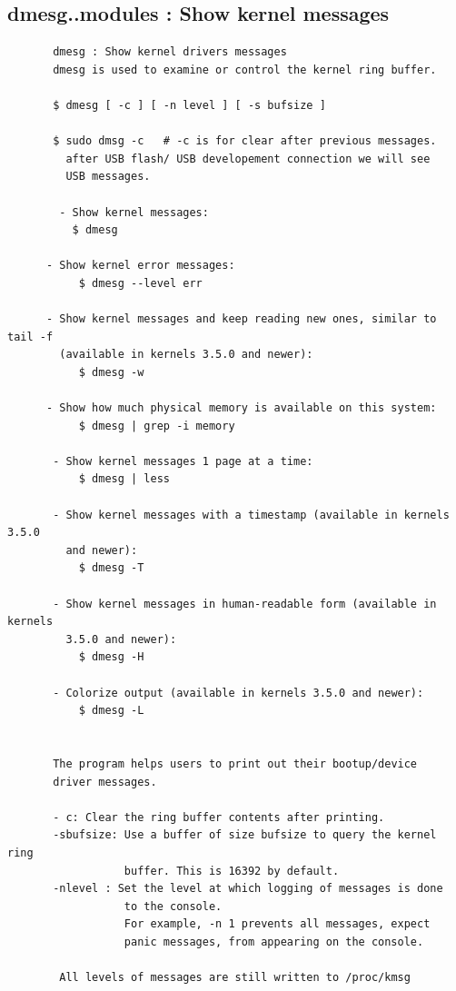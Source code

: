 \documentclass[a4paper,12pt]{article}
\begin{document}
\subsection{dmesg..modules : Show kernel messages }
\begin{verbatim}
       dmesg : Show kernel drivers messages
       dmesg is used to examine or control the kernel ring buffer.

       $ dmesg [ -c ] [ -n level ] [ -s bufsize ]

       $ sudo dmsg -c   # -c is for clear after previous messages.
         after USB flash/ USB developement connection we will see 
         USB messages. 

        - Show kernel messages:
          $ dmesg

      - Show kernel error messages:
           $ dmesg --level err

      - Show kernel messages and keep reading new ones, similar to tail -f 
        (available in kernels 3.5.0 and newer):
           $ dmesg -w
   
      - Show how much physical memory is available on this system:
           $ dmesg | grep -i memory

       - Show kernel messages 1 page at a time:
           $ dmesg | less

       - Show kernel messages with a timestamp (available in kernels 3.5.0 
         and newer):
           $ dmesg -T

       - Show kernel messages in human-readable form (available in kernels 
         3.5.0 and newer):
           $ dmesg -H

       - Colorize output (available in kernels 3.5.0 and newer):
           $ dmesg -L


       The program helps users to print out their bootup/device 
       driver messages.
       
       - c: Clear the ring buffer contents after printing.
       -sbufsize: Use a buffer of size bufsize to query the kernel ring 
                  buffer. This is 16392 by default.
       -nlevel : Set the level at which logging of messages is done
                  to the console.
                  For example, -n 1 prevents all messages, expect
                  panic messages, from appearing on the console.
        
        All levels of messages are still written to /proc/kmsg


\end{verbatim}
\end{document}
